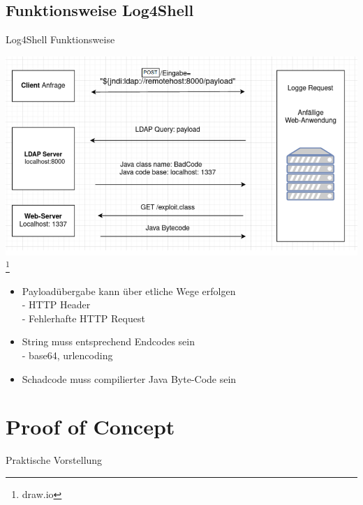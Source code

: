 \documentclass{beamer}
\begin{document}
\subsection{Funktionsweise Log4Shell}
\begin{frame}{Log4Shell Funktionsweise}
\begin{center}
\includegraphics[scale=0.35]{log4s.png}\footnote{draw.io}
\end{center}
\end{frame}
\begin{frame}
 \begin{itemize}
 \item Payloadübergabe kann über etliche Wege erfolgen\\
  - HTTP Header\\
  - Fehlerhafte HTTP Request
  \item String muss entsprechend Endcodes sein\\
  - base64, urlencoding
  \item Schadcode muss compilierter Java Byte-Code sein
 \end{itemize}

\end{frame}
\section{Proof of Concept}
\begin{frame}{Praktische Vorstellung}
 
\end{frame}
\end{document}
